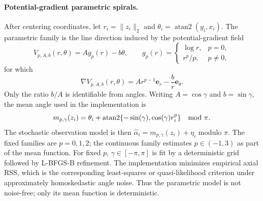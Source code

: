 \documentclass[10pt]{article}
\begin{document}
\paragraph{Potential-gradient parametric spirals.}
After centering coordinates, let $r_i=\|z_i\|_2$ and $\theta_i=\operatorname{atan2}(y_i,x_i)$.  The parametric family is the line direction induced by the potential-gradient field
\[
  V_{p,A,b}(r,\theta)=A g_p(r)-b\theta,\qquad
  g_p(r)=
  \begin{cases}
    \log r, & p=0,\\
    r^p/p, & p\ne0,
  \end{cases}
\]
for which
\[
  \nabla V_{p,A,b}(r,\theta)=A r^{p-1}\mathbf e_r-\frac{b}{r}\mathbf e_\theta .
\]
Only the ratio $b/A$ is identifiable from angles.  Writing $A=\cos\gamma$ and $b=\sin\gamma$, the mean angle used in the implementation is
\begin{equation}
  m_{p,\gamma}(z_i)=
  \theta_i+\operatorname{atan2}\{-\sin(\gamma),\cos(\gamma)r_i^p\}
  \quad {\rm mod}\ \pi .
  \label{eq:parametric}
\end{equation}
The stochastic observation model is then $\hat\alpha_i=m_{p,\gamma}(z_i)+\eta_i$ modulo $\pi$.  The fixed families are $p=0,1,2$; the continuous family estimates $p\in(-1,3)$ as part of the mean function.  For fixed $p$, $\gamma\in[-\pi,\pi]$ is fit by a deterministic grid followed by L-BFGS-B refinement.  The implementation minimizes empirical axial RSS, which is the corresponding least-squares or quasi-likelihood criterion under approximately homoskedastic angle noise.  Thus the parametric model is not noise-free; only its mean function is deterministic.
\end{document}
